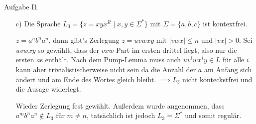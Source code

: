 \documentclass{beamer}
\newenvironment{ppl}{\fontfamily{pzc}\selectfont}{\par}
\begin{document}
\begin{frame}{Aufgabe I1}
	\begin{itemize}
		\item[c)] Die Sprache $L_3 = \{z = xyx^R \mid x, y \in \Sigma^\ast\}$ mit $\Sigma = \{a, b, c\}$ ist kontextfrei.\pause
		\item[ ]\begin{ppl}$z=a^nb^na^n$, dann gibt's Zerlegung $z = uvwxy$ mit $|vwx| \leq n$ und $|vx| > 0$. Sei $uvwxy$ so gewählt, dass der $vxw$-Part im ersten drittel liegt, also nur die ersten $a$s enthält. Nach dem Pump-Lemma muss auch $uv^iwx^iy \in L$ für alle $i$ kann aber trivialistischerweise nicht sein da die Anzahl der $a$ am Anfang sich ändert und am Ende des Wortes gleich bleibt. $\implies L_3$  nicht konteckstfrei und die Ausage widerlegt.\end{ppl}\pause
		\alert<+->{Wieder Zerlegung fest gewählt. Außerdem wurde angenommen, dass $a^m b^n a^n \notin L_3$ für $m \neq n$, tatsächlich ist jedoch $L_3 = \Sigma^\ast$ und somit regulär.}
	\end{itemize}
\end{frame}
\end{document}
